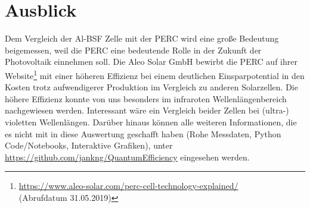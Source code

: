 \documentclass[ngerman, twocolumn]{scrartcl}
\begin{document}
\section{Ausblick}
Dem Vergleich der Al-BSF Zelle mit der PERC wird eine große Bedeutung beigemessen, weil die PERC eine bedeutende Rolle in der Zukunft der Photovoltaik einnehmen soll. Die Aleo Solar GmbH bewirbt die PERC auf ihrer Website\footnote{\url{https://www.aleo-solar.com/perc-cell-technology-explained/}\\(Abrufdatum 31.05.2019)} mit einer höheren Effizienz bei einem deutlichen Einsparpotential in den Kosten trotz aufwendigerer Produktion im Vergleich zu anderen Solarzellen. Die höhere Effizienz konnte von uns besonders im infraroten Wellenlängenbereich nachgewiesen werden. Interessant wäre ein Vergleich beider Zellen bei (ultra-) violetten Wellenlängen. Darüber hinaus können alle weiteren Informationen, die es nicht mit in diese Auswertung geschafft haben (Rohe Messdaten, Python Code/Notebooks, Interaktive Grafiken), unter \url{https://github.com/jankng/QuantumEfficiency} eingesehen werden.
\end{document}
